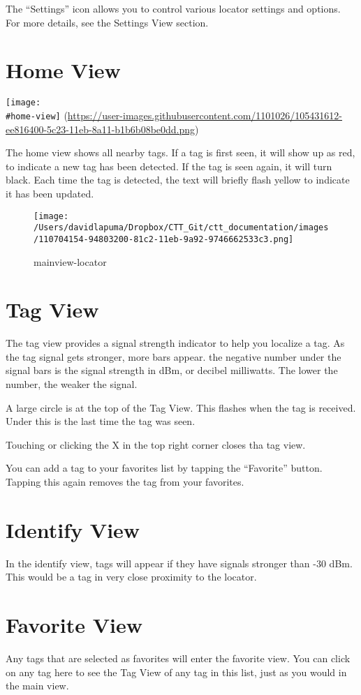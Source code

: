 \documentclass[
]{article}
\begin{document}
The ``Settings'' icon allows you to control various locator settings and
options. For more details, see the Settings View section.

\hypertarget{home-view}{%
\section{Home View}\label{home-view}}

\texttt{[image: \\\#home-view]}
(\url{https://user-images.githubusercontent.com/1101026/105431612-ee816400-5c23-11eb-8a11-b1b6b08be0dd.png})

The home view shows all nearby tags. If a tag is first seen, it will
show up as red, to indicate a new tag has been detected. If the tag is
seen again, it will turn black. Each time the tag is detected, the text
will briefly flash yellow to indicate it has been updated.

\begin{figure}
\centering
\texttt{[image: /Users/davidlapuma/Dropbox/CTT\_Git/ctt\_documentation/images/110704154-94803200-81c2-11eb-9a92-9746662533c3.png]}
\caption{mainview-locator}
\end{figure}

\hypertarget{tag-view}{%
\section{Tag View}\label{tag-view}}

The tag view provides a signal strength indicator to help you localize a
tag. As the tag signal gets stronger, more bars appear. the negative
number under the signal bars is the signal strength in dBm, or decibel
milliwatts. The lower the number, the weaker the signal.

A large circle is at the top of the Tag View. This flashes when the tag
is received. Under this is the last time the tag was seen.

Touching or clicking the X in the top right corner closes tha tag view.

You can add a tag to your favorites list by tapping the ``Favorite''
button. Tapping this again removes the tag from your favorites.

\hypertarget{identify-view}{%
\section{Identify View}\label{identify-view}}

In the identify view, tags will appear if they have signals stronger
than -30 dBm. This would be a tag in very close proximity to the
locator.

\hypertarget{favorite-view}{%
\section{Favorite View}\label{favorite-view}}

Any tags that are selected as favorites will enter the favorite view.
You can click on any tag here to see the Tag View of any tag in this
list, just as you would in the main view.
\end{document}
